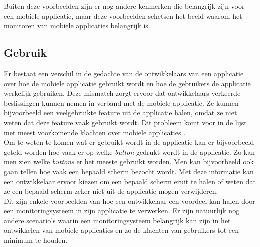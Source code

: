 Buiten deze voorbeelden zijn er nog andere kenmerken die belangrijk zijn voor een mobiele applicatie, maar deze voorbeelden schetsen het beeld waarom het monitoren van mobiele applicaties belangrijk is.

\subsection{Gebruik}
Er bestaat een verschil in de gedachte van de ontwikkelaars van een applicatie over hoe de mobiele applicatie gebruikt wordt en hoe de gebruikers de applicatie werkelijk gebruiken. Deze mismatch zorgt ervoor dat ontwikkelaars verkeerde beslissingen kunnen nemen in verband met de mobiele applicatie. Ze kunnen bijvoorbeeld een veelgebruikte feature uit de applicatie halen, omdat ze niet weten dat deze feature vaak gebruikt wordt. Dit probleem komt voor in de lijst met meest voorkomende klachten over mobiele applicaties \cite{AppSucks}. \\

Om te weten te komen wat er gebruikt wordt in de applicatie kan er bijvoorbeeld geteld worden hoe vaak er op welke \textit{button} gedrukt wordt in de applicatie. Zo kan men zien welke \textit{buttons} er het meeste gebruikt worden. Men kan bijvoorbeeld ook gaan tellen hoe vaak een bepaald scherm bezocht wordt. Met deze informatie kan een ontwikkelaar ervoor kiezen om een bepaald scherm eruit te halen of weten dat ze een bepaald scherm zeker niet uit de applicatie mogen verwijderen. \\


Dit zijn enkele voorbeelden van hoe een ontwikkelaar een voordeel kan halen door een monitoringsysteem in zijn applicatie te verwerken. Er zijn natuurlijk nog andere scenario's waarin een monitoringsysteem belangrijk kan zijn in het ontwikkelen van mobiele applicaties en zo de klachten van gebruikers tot een minimum te houden.